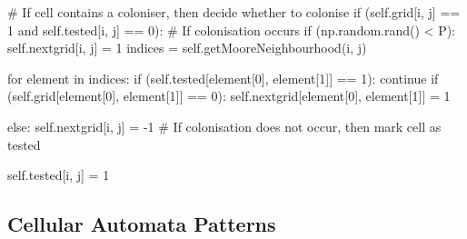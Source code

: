 \documentclass[bibend=bibtex,lang=cn,11pt,a4paper]{elegantpaper}
\begin{document}
\begin{python}
                # If cell contains a coloniser, then decide whether to colonise
                if (self.grid[i, j] == 1 and self.tested[i, j] == 0):
                    # If colonisation occurs
                    if (np.random.rand() < P):
                        self.nextgrid[i, j] = 1
                        indices = self.getMooreNeighbourhood(i, j)

                        for element in indices:
                            if (self.tested[element[0], element[1]] == 1):
                                continue
                            if (self.grid[element[0], element[1]] == 0):
                                self.nextgrid[element[0], element[1]] = 1

                    else:
                        self.nextgrid[i, j] = -1  # If colonisation does not occur, then mark cell as tested

                    self.tested[i, j] = 1
\end{python}

\subsection{Cellular Automata Patterns}
\end{document}
